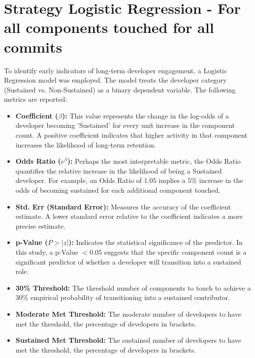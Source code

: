 \section{Strategy Logistic Regression - For all components touched for all commits} 

To identify early indicators of long-term developer engagement, a Logistic Regression model was employed. The model treats the developer category (Sustained vs. Non-Sustained) as a binary dependent variable. The following metrics are reported:

\begin{itemize}
    \item \textbf{Coefficient ($\beta$):} This value represents the change in the log-odds of a developer becoming 'Sustained' for every unit increase in the component count. A positive coefficient indicates that higher activity in that component increases the likelihood of long-term retention.
    \item \textbf{Odds Ratio ($e^\beta$):} Perhaps the most interpretable metric, the Odds Ratio quantifies the relative increase in the likelihood of being a Sustained developer. For example, an Odds Ratio of $1.05$ implies a $5\%$ increase in the odds of becoming sustained for each additional component touched.
    \item \textbf{Std. Err (Standard Error):} Measures the accuracy of the coefficient estimate. A lower standard error relative to the coefficient indicates a more precise estimate.
    \item \textbf{p-Value ($P>|z|$):} Indicates the statistical significance of the predictor. In this study, a p-Value $< 0.05$ suggests that the specific component count is a significant predictor of whether a developer will transition into a sustained role.
    \item \textbf{30\% Threshold:} The threshold number of components to touch to achieve a 30\% empirical probability of transitioning into a sustained contributor.
    \item \textbf{Moderate Met Threshold:} The moderate number of developers to have met the threshold, the percentage of developers in brackets.
    \item \textbf{Sustained Met Threshold:} The sustained number of developers to have met the threshold, the percentage of developers in brackets.
\end{itemize}

